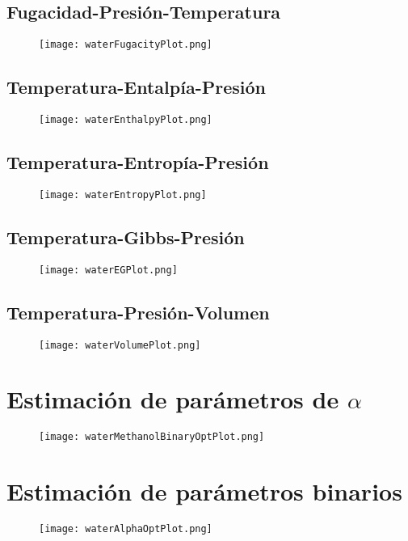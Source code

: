	\subsection{Fugacidad-Presión-Temperatura}\label{subsec:fpt}
		\begin{figure}[!h]
			\texttt{[image: waterFugacityPlot.png]}
		\end{figure}
	\subsection{Temperatura-Entalpía-Presión}\label{subsec:tep}
		\begin{figure}[!h]
			\texttt{[image: waterEnthalpyPlot.png]}
		\end{figure}
	\subsection{Temperatura-Entropía-Presión}\label{subsec:tsp}
		\begin{figure}[!h]
			\texttt{[image: waterEntropyPlot.png]}
		\end{figure}
	\subsection{Temperatura-Gibbs-Presión}\label{subsec:tgp}
		\begin{figure}[!h]
			\texttt{[image: waterEGPlot.png]}
		\end{figure}
	\subsection{Temperatura-Presión-Volumen}\label{subsec:tpv}
		\begin{figure}[!h]
			\texttt{[image: waterVolumePlot.png]}
		\end{figure}
	
	









\section{Estimación de parámetros de $\alpha$}\label{sec:webBinaryOptim}
\begin{figure}
	\texttt{[image: waterMethanolBinaryOptPlot.png]}
\end{figure}


\section{Estimación de parámetros binarios}\label{sec:webBinaryOptim}

\begin{figure}
	\texttt{[image: waterAlphaOptPlot.png]}
\end{figure}



